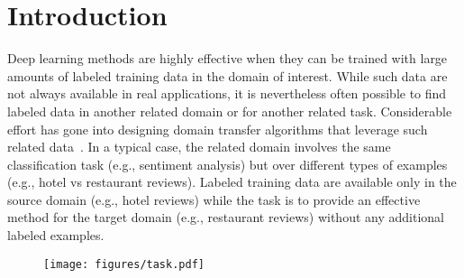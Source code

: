 \section{Introduction}

Deep learning methods are highly effective when they can be trained with large amounts of labeled training data in the domain of interest. While such data are not always available in real applications, it is nevertheless often possible to find labeled data in another related domain or for another related task. Considerable effort has gone into designing domain transfer algorithms that leverage such related data~\cite{glorot2011domain,chen2012marginalized,zhou2016bi}. In a typical case, the related domain involves the same classification task (e.g., sentiment analysis) but over different types of examples (e.g., hotel vs restaurant reviews). Labeled training data are available only in the source domain (e.g., hotel reviews) while the task is to provide an effective method for the target domain (e.g., restaurant reviews) without any additional labeled examples. 



\begin{figure}[t]
\centering
\texttt{[image: figures/task.pdf]}
\caption{
}\label{fig:pathology}
\vspace{-0.1in}
\end{figure}

